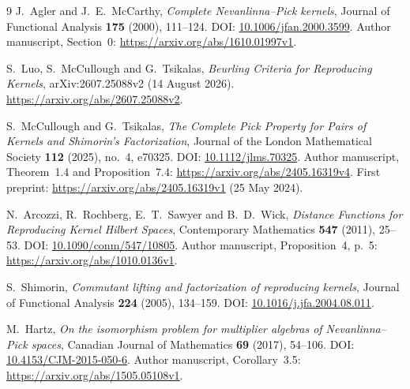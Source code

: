 \documentclass[11pt]{article}
\begin{document}
\begin{thebibliography}{9}
J.~Agler and J.~E.~McCarthy,
\emph{Complete Nevanlinna--Pick kernels},
Journal of Functional Analysis \textbf{175} (2000), 111--124.
DOI: \href{https://doi.org/10.1006/jfan.2000.3599}{10.1006/jfan.2000.3599}.
Author manuscript, Section~0:
\url{https://arxiv.org/abs/1610.01997v1}.

S.~Luo, S.~McCullough and G.~Tsikalas,
\emph{Beurling Criteria for Reproducing Kernels},
arXiv:2607.25088v2 (14 August 2026).
\url{https://arxiv.org/abs/2607.25088v2}.

S.~McCullough and G.~Tsikalas,
\emph{The Complete Pick Property for Pairs of Kernels and Shimorin's
Factorization}, Journal of the London Mathematical Society
\textbf{112} (2025), no.~4, e70325.
DOI: \href{https://doi.org/10.1112/jlms.70325}{10.1112/jlms.70325}.
Author manuscript, Theorem~1.4 and Proposition~7.4:
\url{https://arxiv.org/abs/2405.16319v4}.
First preprint: \url{https://arxiv.org/abs/2405.16319v1} (25 May 2024).

N.~Arcozzi, R.~Rochberg, E.~T.~Sawyer and B.~D.~Wick,
\emph{Distance Functions for Reproducing Kernel Hilbert Spaces},
Contemporary Mathematics \textbf{547} (2011), 25--53.
DOI: \href{https://doi.org/10.1090/conm/547/10805}{10.1090/conm/547/10805}.
Author manuscript, Proposition~4, p.~5:
\url{https://arxiv.org/abs/1010.0136v1}.

S.~Shimorin,
\emph{Commutant lifting and factorization of reproducing kernels},
Journal of Functional Analysis \textbf{224} (2005), 134--159.
DOI: \href{https://doi.org/10.1016/j.jfa.2004.08.011}{10.1016/j.jfa.2004.08.011}.

M.~Hartz,
\emph{On the isomorphism problem for multiplier algebras of
Nevanlinna--Pick spaces}, Canadian Journal of Mathematics
\textbf{69} (2017), 54--106.
DOI: \href{https://doi.org/10.4153/CJM-2015-050-6}{10.4153/CJM-2015-050-6}.
Author manuscript, Corollary~3.5:
\url{https://arxiv.org/abs/1505.05108v1}.
\end{thebibliography}
\end{document}

